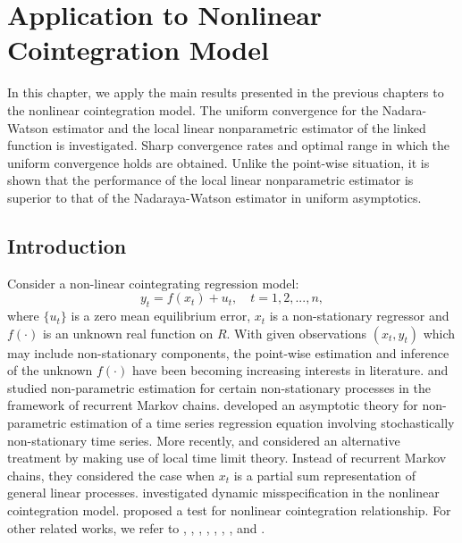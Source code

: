\chapter{Application to Nonlinear Cointegration Model} 
\ifpdf
    \graphicspath{{Chapter4/Chapter4Figs/PNG/}{Chapter4/Chapter4Figs/PDF/}{Chapter4/Chapter4Figs/}}
\else
    \graphicspath{{Chapter4/Chapter4Figs/EPS/}{Chapter4/Chapter4Figs/}}
\fi

In this chapter, we apply the main results presented in the previous chapters to the nonlinear cointegration model. The uniform convergence for the Nadara-Watson estimator and the local linear nonparametric  estimator of the linked function is investigated. Sharp convergence rates and optimal range in which the uniform convergence holds are obtained. Unlike the point-wise situation, it is shown that the performance of the local linear nonparametric  estimator is superior to that of the Nadaraya-Watson estimator in uniform asymptotics.


\section{Introduction}

Consider a non-linear cointegrating regression model:
\begin{equation}
y_{t}=f(x_{t})+u_{t},\quad t=1,2,...,n,  \label{eqn:4:mo1}
\end{equation}%
where $\{u_{t}\}$ is a  zero mean  equilibrium error, $x_{t}$ is a
non-stationary  regressor and  $f(\cdot)$ is an unknown  real function on $R$. With given observations $(x_t, y_t)$ which may include
non-stationary components, the point-wise estimation  and
inference of the unknown $f(\cdot)$ have been becoming increasing
interests in literature. \cite{karlsentjostheim2001} and \cite{guerre2004} studied
non-parametric estimation for certain non-stationary processes in the
framework of recurrent Markov chains. \cite{karlsenmyklebusttjostheim2007}
developed an asymptotic theory for non-parametric estimation of a
time series regression equation involving stochastically
non-stationary time series. More recently,  \citet[][\citeyear{wangphillips2009}, \citeyear{wangphillips2010b}]{wangphillips2010a} and \cite{cailipark2009} considered an alternative treatment by making use of local
time limit theory. Instead of recurrent Markov chains, they considered the case when
$x_t$ is a partial sum representation of general linear processes. \cite{kasparisphillips2012} investigated dynamic misspecification in the nonlinear cointegration model. \cite{choisaikkonen2010} proposed a test for nonlinear cointegration relationship. For other related works, we refer to \citet[][\citeyear{parkphillips2001}]{parkphillips1999}, \cite{bandi2004}, \citet[][\citeyear{gaomaxwelllutjostheim2009b}]{gaomaxwelllutjostheim2009a}, \cite{choisaikkonen2004},  \cite{marmer2008}, \cite{chengaoli2009}, \cite{wangphillips2012}, and \cite{wang2013}.

